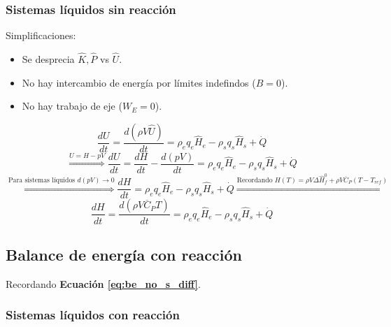         \subsubsection{Sistemas líquidos sin reacción}
        
        Simplificaciones:
        \begin{itemize}
            \item Se desprecia \(\widehat{K},\widehat{P}\) vs \(\widehat{U}\).
            \item No hay intercambio de energía por límites indefindos (\(B=0\)).
            \item No hay trabajo de eje (\(W_{E}=0\)).
        \end{itemize}
        \[\frac{dU}{dt} = \frac{d\left ( \rho V \widehat{U} \right )}{dt} = \rho_{e} q_{e} \widehat{H}_{e} - \rho_{s} q_{s} \widehat{H}_{s} + \dot{Q}\]
        \[\overset{U=H-pV}{\Rightarrow} \frac{dU}{dt} = \frac{dH}{dt} - \frac{d\left ( pV \right )}{dt} = \rho_{e} q_{e} \widehat{H}_{e} - \rho_{s} q_{s} \widehat{H}_{s} + \dot{Q}\]
        \[\overset{\text{Para sistemas líquidos } d(pV) \rightarrow 0}{\Rightarrow} \frac{dH}{dt} = \rho_{e} q_{e} \widehat{H}_{e} - \rho_{s} q_{s} \widehat{H}_{s} + \dot{Q} \overset{\text{Recordando } H(T) = \rho V \Delta \widehat{H}_{f}^{0} + \rho V \overline{C}_{P}\left ( T - T_{ref} \right )}{\Rightarrow}\]
        \begin{equation}
        \label{eq:be_ns_sis_liquidos_sin_rxn}
            \frac{dH}{dt} = \frac{d\left (\rho V \overline{C}_{P}T \right )}{dt} = \rho_{e} q_{e} \widehat{H}_{e} - \rho_{s} q_{s} \widehat{H}_{s} + \dot{Q}
        \end{equation}
    
    \subsection{Balance de energía con reacción}
    
    Recordando \textbf{Ecuación \ref{eq:be_no_s_diff}}.
    
        \subsubsection{Sistemas líquidos con reacción}
        
